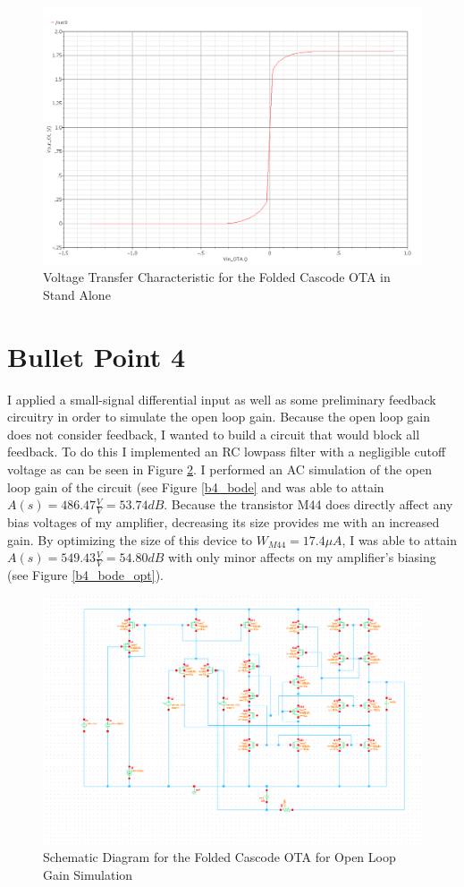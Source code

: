 \documentclass{article}
\begin{document}
\begin{figure}[H]
\centering
\includegraphics[width=6in]{bullet3.png}
\caption{Voltage Transfer Characteristic for the Folded Cascode OTA in Stand Alone}
\label{b3}
\end{figure}
\newpage

\section{Bullet Point 4}
I applied a small-signal differential input as well as some preliminary feedback circuitry in order to simulate the open loop gain. Because the open loop gain does not consider feedback, I wanted to build a  circuit that would block all feedback. To do this I implemented an RC lowpass filter with a negligible cutoff voltage as can be seen in Figure \ref{b4_schem}. I performed an AC simulation of the open loop gain of the circuit (see Figure \ref{b4_bode} and was able to attain $A(s) = 486.47\frac{V}{V} = 53.74dB$. Because the transistor M44 does directly affect any bias voltages of my amplifier, decreasing its size provides me with an increased gain. By optimizing the size of this device to $W_{M44} = 17.4\mu A$, I was able to attain $A(s) = 549.43\frac{V}{V} = 54.80dB$ with only minor affects on my amplifier's biasing (see Figure \ref{b4_bode_opt}).

\begin{figure}[H]
\centering
\includegraphics[width=6in]{bullet4_schem.png}
\caption{Schematic Diagram for the Folded Cascode OTA for Open Loop Gain Simulation}
\label{b4_schem}
\end{figure}
\end{document}
